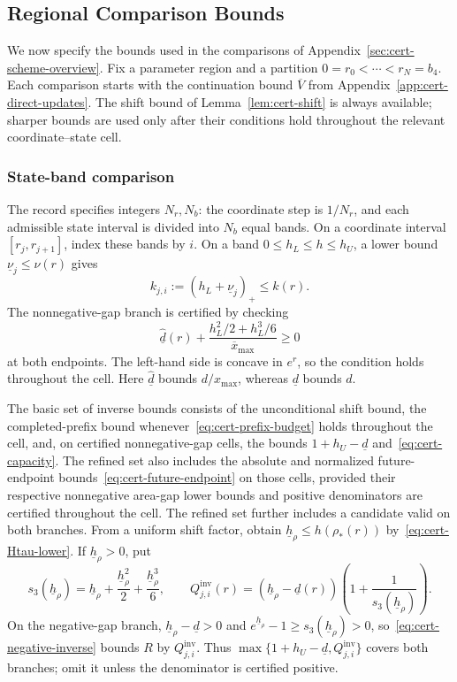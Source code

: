 \documentclass[11pt]{article}
\theoremstyle{definition}
\theoremstyle{remark}
\begin{document}
\subsection{Regional Comparison Bounds}
\label{sec:cert-schemes}

We now specify the bounds used in the comparisons of
Appendix~\ref{sec:cert-scheme-overview}.  Fix a parameter region and a
partition $0=r_0<\cdots<r_N=b_4$.  Each comparison starts with the
continuation bound $\overline V$ from
Appendix~\ref{app:cert-direct-updates}.
The shift bound of Lemma~\ref{lem:cert-shift} is always available;
sharper bounds are used only after their conditions hold throughout
the relevant coordinate--state cell.

\subsubsection{State-band comparison}

The record specifies integers $N_r,N_b$: the coordinate step is $1/N_r$,
and each admissible state interval is divided into $N_b$ equal bands.
On a coordinate interval $[r_j,r_{j+1}]$, index these bands by $i$.
On a band
$0\le h_L\le h\le h_U$, a lower bound
$\underline\nu_j\le\nu(r)$ gives
\[
 k_{j,i}:=(h_L+\underline\nu_j)_+\le k(r).
\]
The nonnegative-gap branch is certified by checking
\[
 \underline{\hat d}(r)
 +\frac{h_L^2/2+h_L^3/6}{\overline{x}_{\max}}\ge0
\]
at both endpoints.  The left-hand side is concave in $e^r$, so the
condition holds throughout the cell.  Here $\underline{\hat d}$ bounds
$d/x_{\max}$, whereas $\underline d$ bounds $d$.

The basic set of inverse bounds consists of the unconditional shift bound, the completed-prefix
bound whenever~\eqref{eq:cert-prefix-budget} holds throughout the cell,
and, on certified nonnegative-gap cells, the bounds
$1+h_U-\underline d$ and~\eqref{eq:cert-capacity}.
The refined set also includes the absolute and normalized future-endpoint
bounds~\eqref{eq:cert-future-endpoint} on those cells,
provided their respective nonnegative area-gap lower bounds and
positive denominators are certified throughout the cell.
The refined set further includes a candidate valid on both branches.  From a uniform
shift factor, obtain $\underline h_\rho\le h(\rho_*(r))$ by~\eqref{eq:cert-Htau-lower}.
If $\underline h_\rho>0$, put
\[
 s_3(\underline h_\rho)=\underline h_\rho+\frac{\underline h_\rho^2}{2}+\frac{\underline h_\rho^3}{6},\qquad
 Q_{j,i}^{\mathrm{inv}}(r)
 =(\underline h_\rho-\underline d(r))\left(1+\frac1{s_3(\underline h_\rho)}\right).
\]
On the negative-gap branch, $\underline h_\rho-\underline d>0$ and
$e^{\underline h_\rho}-1\ge s_3(\underline h_\rho)>0$, so~\eqref{eq:cert-negative-inverse}
bounds $R$ by $Q_{j,i}^{\mathrm{inv}}$.
Thus $\max\{1+h_U-\underline d,Q_{j,i}^{\mathrm{inv}}\}$
covers both branches; omit it unless the denominator is certified positive.
\end{document}
